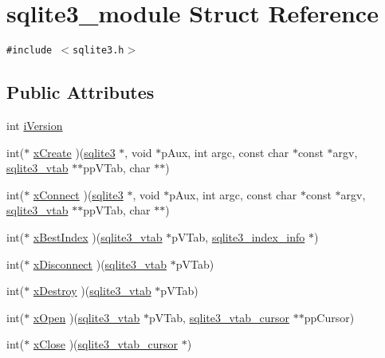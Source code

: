 \hypertarget{structsqlite3__module}{
\section{sqlite3\_\-module Struct Reference}
\label{structsqlite3__module}
}
{\tt \#include $<$sqlite3.h$>$}

\subsection*{Public Attributes}
\begin{CompactItemize}
\item 
int \hyperlink{structsqlite3__module_42b11d080dc205aea43581b18f925afe}{iVersion}
\item 
int($\ast$ \hyperlink{structsqlite3__module_95e327c9d32abd731013395d9e12b8f9}{xCreate} )(\hyperlink{sqlite3_8h_0ef6f2646262c8a9b24368d8ac140f69}{sqlite3} $\ast$, void $\ast$pAux, int argc, const char $\ast$const $\ast$argv, \hyperlink{structsqlite3__vtab}{sqlite3\_\-vtab} $\ast$$\ast$ppVTab, char $\ast$$\ast$)
\item 
int($\ast$ \hyperlink{structsqlite3__module_cdd9ccc4a6acff230b2d579172ae32d0}{xConnect} )(\hyperlink{sqlite3_8h_0ef6f2646262c8a9b24368d8ac140f69}{sqlite3} $\ast$, void $\ast$pAux, int argc, const char $\ast$const $\ast$argv, \hyperlink{structsqlite3__vtab}{sqlite3\_\-vtab} $\ast$$\ast$ppVTab, char $\ast$$\ast$)
\item 
int($\ast$ \hyperlink{structsqlite3__module_66577e230ca8de525b30ee6f287eafb1}{xBestIndex} )(\hyperlink{structsqlite3__vtab}{sqlite3\_\-vtab} $\ast$pVTab, \hyperlink{structsqlite3__index__info}{sqlite3\_\-index\_\-info} $\ast$)
\item 
int($\ast$ \hyperlink{structsqlite3__module_5dbaa6ff075eaff25ccfddaedba06934}{xDisconnect} )(\hyperlink{structsqlite3__vtab}{sqlite3\_\-vtab} $\ast$pVTab)
\item 
int($\ast$ \hyperlink{structsqlite3__module_296dae8dadd4eb1f7d0f1187650c7aa5}{xDestroy} )(\hyperlink{structsqlite3__vtab}{sqlite3\_\-vtab} $\ast$pVTab)
\item 
int($\ast$ \hyperlink{structsqlite3__module_2cb9f8c149617189efa6ceec0a3211e9}{xOpen} )(\hyperlink{structsqlite3__vtab}{sqlite3\_\-vtab} $\ast$pVTab, \hyperlink{structsqlite3__vtab__cursor}{sqlite3\_\-vtab\_\-cursor} $\ast$$\ast$ppCursor)
\item 
int($\ast$ \hyperlink{structsqlite3__module_514c66634a5297ca9879947fa6f8f10f}{xClose} )(\hyperlink{structsqlite3__vtab__cursor}{sqlite3\_\-vtab\_\-cursor} $\ast$)
$$
\end{CompactItemize}
